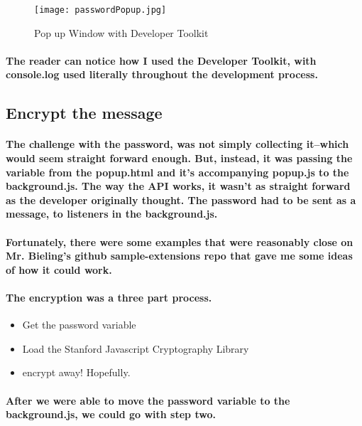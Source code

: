 \begin{figure}[H]
    \centering
    \texttt{[image: passwordPopup.jpg]}
    \caption{\label{fig: withButton} Pop up Window with Developer Toolkit}
\end{figure}

\paragraph{The reader can notice how I used the Developer Toolkit, with console.log used literally throughout the development process.}

\subsection{Encrypt the message}
\paragraph{The challenge with the password, was not simply collecting it--which would seem straight forward enough. But, instead, it was passing the variable from the popup.html and it's accompanying popup.js to the background.js. The way the API works, it wasn't as straight forward as the developer originally thought. The password had to be sent as a message, to listeners in the background.js.}

\paragraph{Fortunately, there were some examples that were reasonably close on Mr. Bieling's github sample-extensions repo that gave me some ideas of how it could work.}

\paragraph{The encryption was a three part process.} 

\begin{itemize}
\item Get the password variable
\item Load the Stanford Javascript Cryptography Library
\item encrypt away! Hopefully. 
\end{itemize}

\paragraph{After we were able to move the password variable to the background.js, we could go with step two.}

